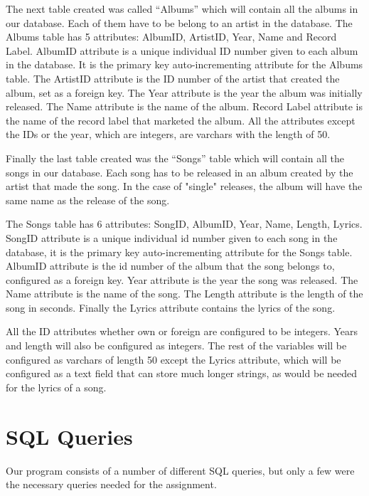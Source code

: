 \documentclass[a4paper,12pt]{article}
\begin{document}
The next table created was called “Albums” which will contain all the albums in our database. Each of them have to be belong to an artist in the database. The Albums table has 5 attributes: AlbumID, ArtistID, Year, Name and Record Label. AlbumID attribute is a unique individual ID number given to each album in the database. It is the primary key auto-incrementing attribute for the Albums table. The ArtistID attribute is the ID number of the artist that created the album, set as a foreign key. The Year attribute is the year the album was initially released. The Name attribute is the name of the album. Record Label attribute is the name of the record label that marketed the album.
All the attributes except the IDs or the year, which are integers, are varchars with the length of 50.

Finally the last table created was the “Songs” table which will contain all the songs in our database. Each song has to be released in  an album created by the artist that made the song. In the case of "single" releases, the album will have the same name as the release of the song.


The Songs table has 6 attributes: SongID, AlbumID, Year, Name, Length, Lyrics.
SongID attribute is a unique individual id number given to each song in the database, it is the primary key auto-incrementing  attribute for the Songs table. AlbumID attribute is the id number of the album that the song belongs to, configured as a foreign key. Year attribute is the year the song was released. The Name attribute is the name of the song. The Length attribute is the length of the song in seconds. Finally the Lyrics attribute contains the lyrics of the song.


All the ID attributes whether own or foreign are configured to be integers. Years and length will also be configured as integers. The rest of the variables will be configured as varchars of length 50 except the Lyrics attribute, which will be configured as a text field that can store much longer strings, as would be needed for the lyrics of a song.

\clearpage


\section{SQL Queries}

Our program consists of a number of different SQL queries, but only a few were the necessary queries needed for the assignment.
\end{document}
